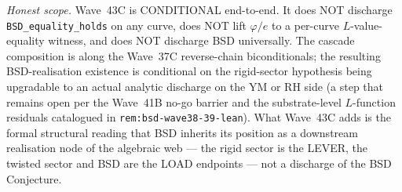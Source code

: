 \begin{remark}
\emph{Honest scope.} Wave~43C is CONDITIONAL end-to-end. It does NOT discharge \texttt{BSD\_equality\_holds} on any curve, does NOT lift $\varphi/e$ to a per-curve $L$-value-equality witness, and does NOT discharge BSD universally. The cascade composition is along the Wave~37C reverse-chain biconditionals; the resulting BSD-realisation existence is conditional on the rigid-sector hypothesis being upgradable to an actual analytic discharge on the YM or RH side (a step that remains open per the Wave~41B no-go barrier and the substrate-level $L$-function residuals catalogued in \texttt{rem:bsd-wave38-39-lean}). What Wave~43C adds is the formal structural reading that BSD inherits its position as a downstream realisation node of the algebraic web --- the rigid sector is the LEVER, the twisted sector and BSD are the LOAD endpoints --- not a discharge of the BSD Conjecture.
\end{remark}

